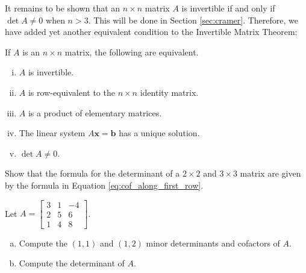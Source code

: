 \documentclass[12pt,letterpaper,reqno]{article}
\numberwithin{equation}{section}
\begin{document}
It remains to be shown that an $n \times n$ matrix $A$ is invertible if and only if $\det A \neq 0$ when $n>3$. This will be done in Section \ref{sec:cramer}. Therefore, we have added yet another equivalent condition to the Invertible Matrix Theorem:

\begin{thm}\label{thm:invertible_matrix_theorem_part_3}
	If $A$ is an $n \times n$ matrix, the following are equivalent.
	\begin{enumerate}[(i)]
		\item $A$ is invertible.
		\item $A$ is row-equivalent to the $n \times n$ identity matrix.
		\item $A$ is a product of elementary matrices.
		\item The linear system $A\mathbf{x}=\mathbf{b}$ has a unique solution.
		\item $\det A \neq 0$.
	\end{enumerate} 	
\end{thm}


\begin{exercise}
Show that the formula for the determinant of a $2 \times 2$ and $3 \times 3$ matrix are given by the formula in Equation \eqref{eq:cof_along_first_row}.
\end{exercise}

\begin{exercise}
Let $A=\begin{bmatrix}
	3 & 1 & -4 \\ 2 & 5 & 6 \\ 1 & 4 & 8
\end{bmatrix}$. 
\begin{enumerate}[(a)]
	\item Compute the $(1,1)$ and $(1,2)$ minor determinants and cofactors of $A$.
	\item Compute the determinant of $A$.
\end{enumerate}	
\end{exercise}
\end{document}
